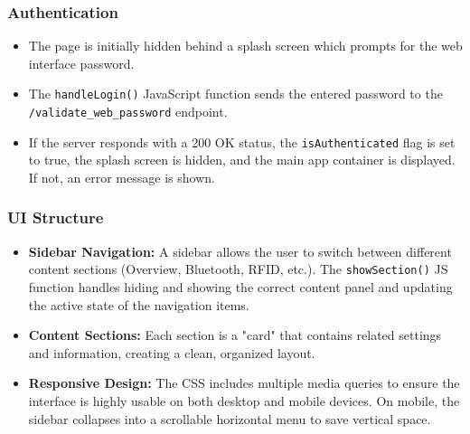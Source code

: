 \documentclass{article}
\begin{document}
\subsubsection{Authentication}
\begin{itemize}
    \item The page is initially hidden behind a splash screen which prompts for the web interface password.
    \item The \texttt{handleLogin()} JavaScript function sends the entered password to the \texttt{/validate\_web\_password} endpoint.
    \item If the server responds with a 200 OK status, the \texttt{isAuthenticated} flag is set to true, the splash screen is hidden, and the main app container is displayed. If not, an error message is shown.
\end{itemize}

\subsubsection{UI Structure}
\begin{itemize}
    \item \textbf{Sidebar Navigation:} A sidebar allows the user to switch between different content sections (Overview, Bluetooth, RFID, etc.). The \texttt{showSection()} JS function handles hiding and showing the correct content panel and updating the active state of the navigation items.
    \item \textbf{Content Sections:} Each section is a "card" that contains related settings and information, creating a clean, organized layout.
    \item \textbf{Responsive Design:} The CSS includes multiple media queries to ensure the interface is highly usable on both desktop and mobile devices. On mobile, the sidebar collapses into a scrollable horizontal menu to save vertical space.
\end{itemize}
\end{document}
